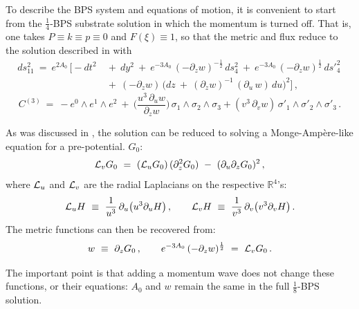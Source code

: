 \documentclass[11pt]{article}
\def\IR{\mathbb{R}}
\def\ncb{{\xi}}
\def\nBPS#1{$\frac{1}{#1}$-BPS}
\numberwithin{equation}{section}
\begin{document}
To describe the BPS system and equations of motion, it is convenient to start from the  \nBPS{4} substrate solution in which the momentum is turned off. That is, one takes $P \equiv k \equiv p \equiv 0$ and $F(\ncb) \equiv 1$, so that the metric and flux reduce to the solution described in \cite{Lunin:2008tf,Bena:2023rzm,Bena:2024dre,Bena:2025hxt} with
%
\begin{equation}
\begin{aligned}
ds_{11}^2 ~=~  e^{2  A_0}\, \Big[ -dt^2 &~+~ dy^2 ~+~ e^{-3  A_0} \, (-\partial_z w )^{-\frac{1}{2}}\, ds_4^2  ~+~ e^{-3  A_0} \, (-\partial_z w )^{\frac{1}{2}}\,  {ds'}_4^2 \,    \\
  &  ~+~  (-\partial_z w ) \, \big( dz ~+~(\partial_z w )^{-1}\,   (\partial_u \, w )   \,d  u \big)^2  \Big]\,,
\end{aligned}
 \label{11metric-subs}
\end{equation}
%
% 
\begin{equation}
 C^{(3)} ~=~  -  e^0 \wedge e^1 \wedge e^2 ~+~\bigg(\frac{u^3 \,\partial_u w}{\partial_z w}\bigg)\,  \sigma_1 \wedge \sigma_2  \wedge \sigma_3
 + (v^3 \,\partial_v w)\,{\sigma'}_1 \wedge {\sigma'}_2  \wedge {\sigma'}_3  \,. \label{C3res2}
\end{equation}
%

As was discussed in \cite{Lunin:2008tf,Bena:2023rzm}, the solution can be reduced to solving a Monge-Amp\`ere-like equation for a pre-potential. $G_0$:
%
\begin{equation}
 {\cal L}_{v} G_0 ~=~  ({\cal L}_{ u} G_0)\,(\partial_z^2 G_0) ~-~ ( \partial_u \partial_z G_0)^2\,, 
 \label{maze-eq}
\end{equation}
%
where  ${\cal L}_{u}$ and ${\cal L}_{v}$ are the radial Laplacians on the respective $\IR^4$'s:
%
\begin{equation}
 {\cal L}_{u} H  ~\equiv~   \frac{1}{u^3}\, \partial_u \big( u^3  \partial_u H \big)  \,,  \qquad  {\cal L}_{v} H  ~\equiv~   \frac{1}{v^3}\, \partial_v \big(v^3 \partial_v H \big)  \,.
 \label{Laps}
\end{equation}
%
The metric functions can then be recovered from:
%
\begin{equation}
w ~\equiv~ \partial_z G_0  \,, \qquad   e^{-3  A_0} \, (-\partial_z w )^{\frac{1}{2}} ~=~ {\cal L}_{v}  G_0 \,.
 \label{solfns}
\end{equation}
%

The important point is that adding a momentum wave does not change these functions, or their equations: $A_0$ and $w$ remain the same in the full \nBPS{8}  solution.
\end{document}
